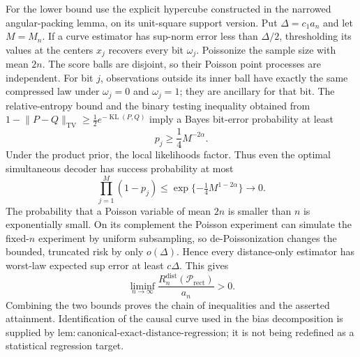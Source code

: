 For the lower bound use the explicit hypercube constructed in the narrowed angular-packing lemma, on its unit-square support version.  Put \(\Delta=c_1a_n\) and let \(M=M_n\).  If a curve estimator has sup-norm error less than \(\Delta/2\), thresholding its values at the centers \(x_j\) recovers every bit \(\omega_j\).  Poissonize the sample size with mean \(2n\).  The score balls are disjoint, so their Poisson point processes are independent.  For bit \(j\), observations outside its inner ball have exactly the same compressed law under \(\omega_j=0\) and \(\omega_j=1\); they are ancillary for that bit.  The relative-entropy bound and the binary testing inequality obtained from \(1-\lVert P-Q\rVert_{\mathrm{TV}}\geq\tfrac12e^{-\operatorname{KL}(P,Q)}\) imply a Bayes bit-error probability at least
\[
 p_j\geq\frac14M^{-2\alpha}.
\]
Under the product prior, the local likelihoods factor.  Thus even the optimal simultaneous decoder has success probability at most
\[
 \prod_{j=1}^M(1-p_j)\leq\exp\{-\tfrac14M^{1-2\alpha}\}\longrightarrow0.
\]
The probability that a Poisson variable of mean \(2n\) is smaller than \(n\) is exponentially small.  On its complement the Poisson experiment can simulate the fixed-\(n\) experiment by uniform subsampling, so de-Poissonization changes the bounded, truncated risk by only \(o(\Delta)\).  Hence every distance-only estimator has worst-law expected sup error at least \(c\Delta\).  This gives
\[
 \liminf_{n\to\infty}\frac{R_n^{\mathrm{dist}}(\mathcal P_{\mathrm{rect}})}{a_n}>0.
\]
Combining the two bounds proves the chain of inequalities and the asserted attainment.  Identification of the causal curve used in the bias decomposition is supplied by \(\mathrm{lem:canonical\text{-}exact\text{-}distance\text{-}regression}\); it is not being redefined as a statistical regression target.